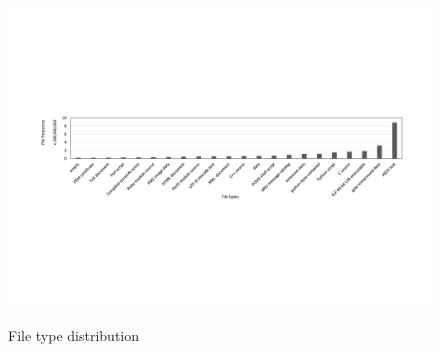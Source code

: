 \begin{figure}
	\centering
	\includegraphics[width=1\textwidth]{graphs/file_type.pdf}\\
	\caption{File type distribution}\label{fig-file-type}
\end{figure}
